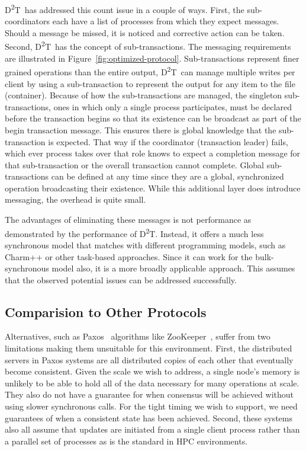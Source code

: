 \documentclass[conference]{sig-alt-gov2}
\newcommand{\DDT}{D\textsuperscript{2}T~}
\newcommand{\DDTns}{D\textsuperscript{2}T}
\begin{document}
\DDT has addressed this count issue in a couple of ways. First, the
sub-coordinators each have a list of processes from which they expect messages.
Should a message be missed, it is noticed and corrective action can be taken.
Second, \DDT has the concept of sub-transactions. The messaging requirements
are illustrated in Figure~\ref{fig:optimized-protocol}.  Sub-transactions
represent finer grained operations than the entire output, \DDT can manage
multiple writes per client by using a sub-transaction to represent the output
for any item to the file (container). Because of how the sub-transactions are
managed, the singleton sub-transactions, ones in which only a single process
participates, must be declared before the transaction begins so that its
existence can be broadcast as part of the begin transaction message. This
ensures there is global knowledge that the sub-transaction is expected.  That
way if the coordinator (transaction leader) fails, which ever process takes
over that role knows to expect a completion message for that sub-transaction or
the overall transaction cannot complete. Global sub-transactions can be defined
at any time since they are a global, synchronized operation broadcasting their
existence. While this additional layer does introduce messaging, the overhead
is quite small.

The advantages of eliminating these messages is not performance as demonstrated
by the performance of \DDTns. Instead, it offers a much less synchronous model
that matches with different programming models, such as Charm++ or other
task-based approaches. Since it can work for the bulk-synchronous model also,
it is a more broadly applicable approach. This assumes that the observed
potential issues can be addressed successfully.

\subsection{Comparision to Other Protocols}
Alternatives, such as Paxos~\cite{Lamport:1998:paxos} algorithms like
ZooKeeper~\cite{Hunt:2010:zookeeper}, suffer from two limitations making them
unsuitable for this environment. First, the distributed servers in Paxos
systems are all distributed copies of each other that eventually become
consistent. Given the scale we wish to address, a single node's memory is
unlikely to be able to hold all of the data necessary for many operations at
scale. They also do not have a guarantee for when consensus will be achieved
without using slower synchronous calls. For the tight timing we wish to
support, we need guarantees of when a consistent state has been achieved.
Second, these systems also all assume that updates are initiated from a single
client process rather than a parallel set of processes as is the standard in
HPC environments.
\end{document}
